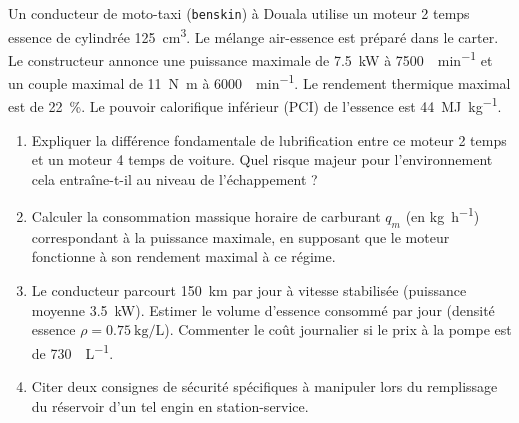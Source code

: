 \documentclass[11pt]{article}
\begin{document}
\begin{exercice}
Un conducteur de moto-taxi (\texttt{benskin}) à Douala utilise un moteur 2 temps essence de cylindrée \SI{125}{\centi\meter\cubed}. Le mélange air-essence est préparé dans le carter. Le constructeur annonce une puissance maximale de \SI{7,5}{\kilo\watt} à \SI{7500}{\tr\per\minute} et un couple maximal de \SI{11}{\newton\meter} à \SI{6000}{\tr\per\minute}. Le rendement thermique maximal est de \SI{22}{\percent}. Le pouvoir calorifique inférieur (PCI) de l'essence est \SI{44}{\mega\joule\per\kilogram}.

\begin{enumerate}
    \item Expliquer la différence fondamentale de lubrification entre ce moteur 2 temps et un moteur 4 temps de voiture. Quel risque majeur pour l'environnement cela entraîne-t-il au niveau de l'échappement ?
    \item Calculer la consommation massique horaire de carburant $q_m$ (en \si{\kilogram\per\hour}) correspondant à la puissance maximale, en supposant que le moteur fonctionne à son rendement maximal à ce régime.
    \item Le conducteur parcourt \SI{150}{\kilo\meter} par jour à vitesse stabilisée (puissance moyenne \SI{3,5}{\kilo\watt}). Estimer le volume d'essence consommé par jour (densité essence $\rho = \SI{0,75}{\kilogram\per\liter}$). Commenter le coût journalier si le prix à la pompe est de \SI{730}{\per\liter}.
    \item Citer deux consignes de sécurité spécifiques à manipuler lors du remplissage du réservoir d'un tel engin en station-service.
\end{enumerate}
\end{exercice}
\end{document}

